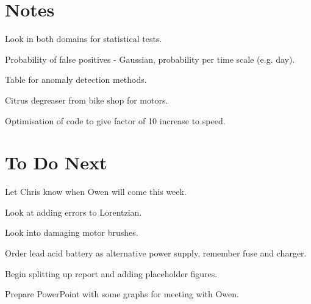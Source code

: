 \documentclass[11pt]{meetingmins}
\begin{document}
\maketitle


\section{Notes}
\begin{items}
\item
Look in both domains for statistical tests.

\item
Probability of false positives - Gaussian, probability per time scale (e.g. day).

\item
Table for anomaly detection methods.

\item
Citrus degreaser from bike shop for motors.

\item
Optimisation of code to give factor of 10 increase to speed.

\end{items}


\section{To Do Next}
\begin{items}
\item
Let Chris know when Owen will come this week.

\item
Look at adding errors to Lorentzian.

\item
Look into damaging motor brushes.

\item
Order lead acid battery as alternative power supply, remember fuse and charger.

\item
Begin splitting up report and adding placeholder figures.

\item
Prepare PowerPoint with some graphs for meeting with Owen.
\end{items}
\end{document}

